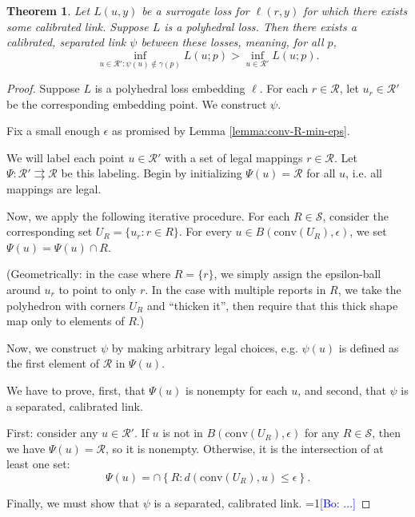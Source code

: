 \documentclass{article}
\newcommand{\Comments}{1}
\newcommand{\mynote}[2]{\ifnum\Comments=1\textcolor{#1}{#2}\fi}
\newcommand{\bo}[1]{\mynote{blue}{[Bo: #1]}}
\newcommand{\R}{\mathcal{R}}
\newcommand{\toto}{\rightrightarrows}
\newcommand{\conv}{\mathrm{conv}}
\newtheorem{theorem}{Theorem}
\begin{document}
\begin{theorem}
  Let $L(u,y)$ be a surrogate loss for $\ell(r,y)$ for which there exists some calibrated link.
  Suppose $L$ is a polyhedral loss.
  Then there exists a calibrated, \emph{separated} link $\psi$ between these losses, meaning, for all $p$,
    \[ \inf_{u \in \R' : \psi(u) \not\in \gamma(p)} L(u;p) > \inf_{u \in \R'} L(u;p) . \]
\end{theorem}

\begin{proof}
Suppose $L$ is a polyhedral loss embedding $\ell$.
For each $r \in \R$, let $u_r \in \R'$ be the corresponding embedding point.
We construct $\psi$.

Fix a small enough $\epsilon$ as promised by Lemma \ref{lemma:conv-R-min-eps}.

We will label each point $u \in \R'$ with a set of legal mappings $r \in \R$.
Let $\Psi: \R' \toto \R$ be this labeling.
Begin by initializing $\Psi(u) = \R$ for all $u$, i.e. all mappings are legal.

Now, we apply the following iterative procedure.
For each $R \in \mathcal{S}$, consider the corresponding set $U_R = \{u_r : r \in R\}$.
For every $u \in B\left(\conv(U_R), \epsilon\right)$, we set $\Psi(u) = \Psi(u) \cap R$.

(Geometrically: in the case where $R=\{r\}$, we simply assign the epsilon-ball around $u_r$ to point to only $r$. In the case with multiple reports in $R$, we take the polyhedron with corners $U_R$ and ``thicken it'', then require that this thick shape map only to elements of $R$.)

Now, we construct $\psi$ by making arbitrary legal choices, e.g. $\psi(u)$ is defined as the first element of $\R$ in $\Psi(u)$.

We have to prove, first, that $\Psi(u)$ is nonempty for each $u$, and second, that $\psi$ is a separated, calibrated link.

First: consider any $u \in \R'$.
If $u$ is not in $B(\conv(U_R),\epsilon)$ for any $R \in \mathcal{S}$, then we have $\Psi(u) = \R$, so it is nonempty.
Otherwise, it is the intersection of at least one set:
  \[ \Psi(u) = \cap \left\{ R : d(\conv(U_R),u) \leq \epsilon \right\} . \]



Finally, we must show that $\psi$ is a separated, calibrated link.
\bo{...}
\end{proof}
\end{document}
